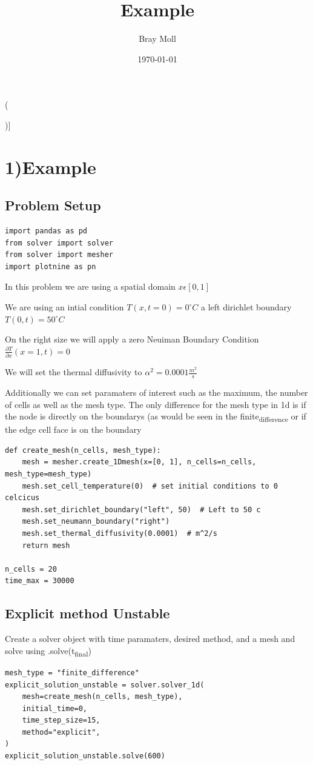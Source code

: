 \documentclass[letterpaper, 11pt]{article}
\author{Bray Moll}
\date{\today}
\title{Example}
\begin{document}
\maketitle
[[Tests](\begin{center}

\end{center})]


\section{1)Example}
\label{sec:orgeb944c4}
\subsection{Problem Setup}
\label{sec:org50c0472}
\begin{verbatim}
import pandas as pd
from solver import solver
from solver import mesher
import plotnine as pn
\end{verbatim}

In this problem we are using a spatial domain
\(x \epsilon [0,1]\)

We are using an intial condition
\(T(x, t=0) = 0^\circ C\)
a left dirichlet boundary
\(T(0, t) = 50^\circ C\)

On the right size we will apply a zero Neuiman Boundary Condition
\(\frac{\partial T}{\partial x} (x = 1, t) = 0\)

We will set the thermal diffusivity to
\(\alpha ^2 = 0.0001 \frac{m^2}{s}\)

Additionally we can set paramaters of interest such as the maximum, the number of cells as well as the mesh type. The only difference for the mesh type in 1d is if the node is directly on the boundarys (as would be seen in the finite\textsubscript{difference} or if the edge cell face is on the boundary
\begin{verbatim}
def create_mesh(n_cells, mesh_type):
    mesh = mesher.create_1Dmesh(x=[0, 1], n_cells=n_cells, mesh_type=mesh_type)
    mesh.set_cell_temperature(0)  # set initial conditions to 0 celcicus
    mesh.set_dirichlet_boundary("left", 50)  # Left to 50 c
    mesh.set_neumann_boundary("right")
    mesh.set_thermal_diffusivity(0.0001)  # m^2/s
    return mesh

n_cells = 20
time_max = 30000

\end{verbatim}
\subsection{Explicit method Unstable}
\label{sec:org283adfd}
Create a solver object with time paramaters, desired method, and a mesh and solve using .solve(t\textsubscript{final})
\begin{verbatim}
mesh_type = "finite_difference"
explicit_solution_unstable = solver.solver_1d(
    mesh=create_mesh(n_cells, mesh_type),
    initial_time=0,
    time_step_size=15,
    method="explicit",
)
explicit_solution_unstable.solve(600)

\end{verbatim}
\end{document}
